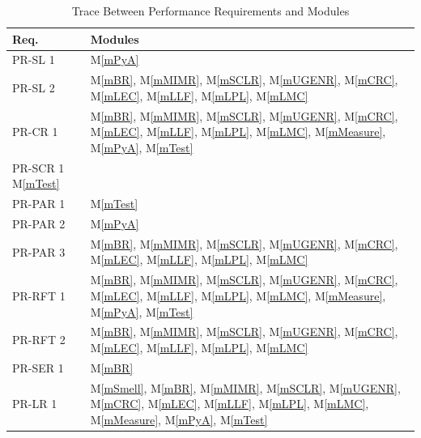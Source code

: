 \documentclass[12pt, titlepage]{article}
\newcommand{\mref}[1]{M\ref{#1}}
\begin{document}
\begin{table}[H]
  \centering
  \begin{tabular}{p{} p{}}
    \toprule \textbf{Req.} & \textbf{Modules}\\
    \midrule
    PR-SL 1 & \mref{mPyA}\\
    PR-SL 2 & \mref{mBR}, \mref{mMIMR}, \mref{mSCLR}, \mref{mUGENR}, \mref{mCRC}, \mref{mLEC}, \mref{mLLF}, \mref{mLPL}, \mref{mLMC}\\
    PR-CR 1 & \mref{mBR}, \mref{mMIMR}, \mref{mSCLR}, \mref{mUGENR}, \mref{mCRC}, \mref{mLEC}, \mref{mLLF}, \mref{mLPL}, \mref{mLMC}, \mref{mMeasure}, \mref{mPyA}, \mref{mTest}\\ 
    PR-SCR 1 \mref{mTest}& \\ 
    PR-PAR 1 & \mref{mTest}\\ 
    PR-PAR 2 & \mref{mPyA}\\ 
    PR-PAR 3 & \mref{mBR}, \mref{mMIMR}, \mref{mSCLR}, \mref{mUGENR}, \mref{mCRC}, \mref{mLEC}, \mref{mLLF}, \mref{mLPL}, \mref{mLMC}\\ 
    PR-RFT 1 & \mref{mBR}, \mref{mMIMR}, \mref{mSCLR}, \mref{mUGENR}, \mref{mCRC}, \mref{mLEC}, \mref{mLLF}, \mref{mLPL}, \mref{mLMC}, \mref{mMeasure}, \mref{mPyA}, \mref{mTest}\\ 
    PR-RFT 2 & \mref{mBR}, \mref{mMIMR}, \mref{mSCLR}, \mref{mUGENR}, \mref{mCRC}, \mref{mLEC}, \mref{mLLF}, \mref{mLPL}, \mref{mLMC}\\
    PR-SER 1 & \mref{mBR}\\ 
    PR-LR 1 & \mref{mSmell}, \mref{mBR}, \mref{mMIMR}, \mref{mSCLR}, \mref{mUGENR}, \mref{mCRC}, \mref{mLEC}, \mref{mLLF}, \mref{mLPL}, \mref{mLMC}, \mref{mMeasure}, \mref{mPyA}, \mref{mTest}\\
    \bottomrule
  \end{tabular}
  \caption{Trace Between Performance Requirements and Modules}
  \label{tab:PR-mod}
\end{table}
\end{document}
